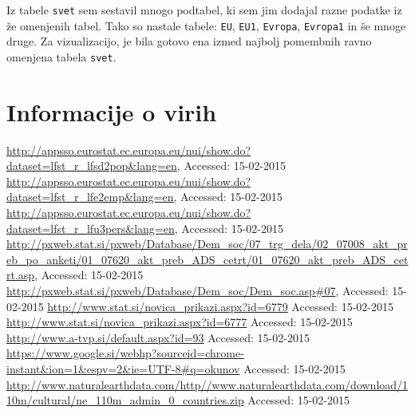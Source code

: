 \documentclass[11pt,a4paper]{article}
\begin{document}
Iz tabele \verb|svet| sem sestavil mnogo podtabel, ki sem jim dodajal razne podatke iz že omenjenih tabel. Tako so nastale tabele: \verb|EU|, \verb|EU1|, \verb|Evropa|, \verb|Evropa1| in še mnoge druge. Za vizualizacijo, je bila gotovo ena izmed najbolj pomembnih ravno omenjena tabela \verb|svet|.

\pagebreak
\section{Informacije o virih}

\begin{thebibliography}{9}

  \url{http://appsso.eurostat.ec.europa.eu/nui/show.do?dataset=lfst_r_lfsd2pop&lang=en},
  {Accessed: 15-02-2015}
  \url{http://appsso.eurostat.ec.europa.eu/nui/show.do?dataset=lfst_r_lfe2emp&lang=en},
  {Accessed: 15-02-2015}
  \url{http://appsso.eurostat.ec.europa.eu/nui/show.do?dataset=lfst_r_lfu3pers&lang=en},
  {Accessed: 15-02-2015}
  \url{http://pxweb.stat.si/pxweb/Database/Dem_soc/07_trg_dela/02_07008_akt_preb_po_anketi/01_07620_akt_preb_ADS_cetrt/01_07620_akt_preb_ADS_cetrt.asp},
  {Accessed: 15-02-2015}
  \url{http://pxweb.stat.si/pxweb/Database/Dem_soc/Dem_soc.asp#07},
  {Accessed: 15-02-2015}
  \url{http://www.stat.si/novica_prikazi.aspx?id=6779}
  {Accessed: 15-02-2015}
  \url{http://www.stat.si/novica_prikazi.aspx?id=6777}
  {Accessed: 15-02-2015}
  \url{http://www.a-tvp.si/default.aspx?id=93}
  {Accessed: 15-02-2015}
  \url{https://www.google.si/webhp?sourceid=chrome-instant&ion=1&espv=2&ie=UTF-8#q=okunov}
  {Accessed: 15-02-2015}
  \url{http://www.naturalearthdata.com/http//www.naturalearthdata.com/download/110m/cultural/ne_110m_admin_0_countries.zip}
  {Accessed: 15-02-2015}
  
\end{thebibliography}
\end{document}

